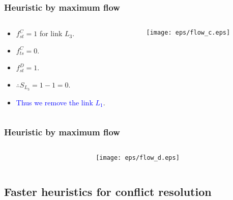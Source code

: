\documentclass[xcolor=dvipsnames,envcountsect,handout]{beamer}
\begin{document}
\begin{frame}
\frametitle{Heuristic by maximum flow} 
\vspace{-6pt}
\begin{columns}
\begin{column}[t]{6cm}
\begin{itemize}
\item $f_{st}^C = 1$ for link $L_3$.
\vspace{6pt}
\item $f_{ts}^C = 0$.
\vspace{6pt}
\item $f_{st}^D = 1$.
\vspace{6pt}
\item $\therefore S_{L_3} = 1 - 1 = 0$.
\vspace{6pt}
\item<2> \textcolor{blue}{Thus we remove the link $L_1$}.
\end{itemize}
\end{column}
\begin{column}[t]{6cm}
\vspace{-8pt}
\begin{figure}[H]
\centering
\texttt{[image: eps/flow\_c.eps]}
\end{figure}
\end{column}
\end{columns}
\end{frame}


\begin{frame}
\frametitle{Heuristic by maximum flow} 
\vspace{-6pt}
\begin{columns}
\begin{column}[t]{6cm}
\end{column}
\begin{column}[t]{6cm}
\vspace{-8pt}
\begin{figure}[H]
\centering
\hspace{-1.4cm}
\texttt{[image: eps/flow\_d.eps]}
\end{figure}
\end{column}
\end{columns}
\end{frame}


\subsection{Faster heuristics for conflict resolution}
\end{document}
